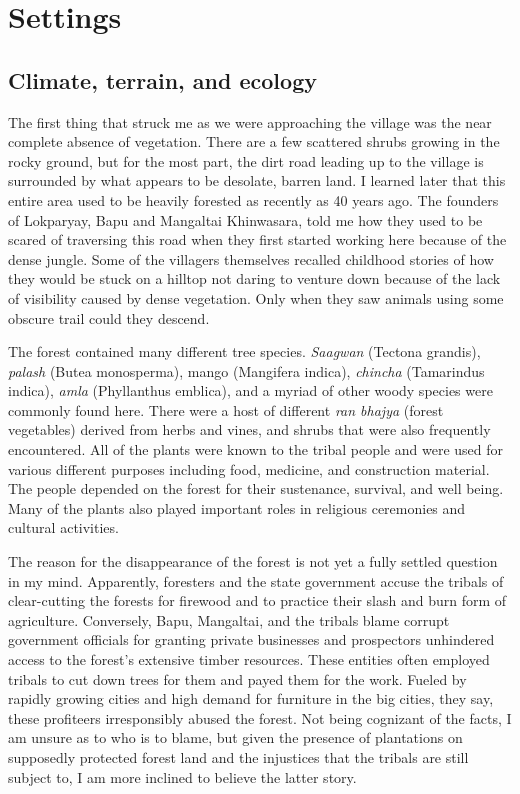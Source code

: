\documentclass{report}
\begin{document}
\tableofcontents

\chapter{Settings}
\section{Climate, terrain, and ecology}

The first thing that struck me as we were approaching the village was the near complete absence of vegetation. There are a few scattered shrubs growing in the rocky ground, but for the most part, the dirt road leading up to the village is surrounded by what appears to be desolate, barren land. I learned later that this entire area used to be heavily forested as recently as 40 years ago. The founders of Lokparyay, Bapu and Mangaltai Khinwasara, told me how they used to be scared of traversing this road when they first started working here because of the dense jungle. Some of the villagers themselves recalled childhood stories of how they would be stuck on a hilltop not daring to venture down because of the lack of visibility caused by dense vegetation. Only when they saw animals using some obscure trail could they descend.

The forest contained many different tree species. \textit{Saagwan} (Tectona grandis), \textit{palash} (Butea monosperma), mango (Mangifera indica), \textit{chincha} (Tamarindus indica), \textit{amla} (Phyllanthus emblica), and a myriad of other woody species were commonly found here. There were a host of different \textit{ran bhajya} (forest vegetables) derived from herbs and vines, and shrubs that were also frequently encountered. All of the plants were known to the tribal people and were used for various different purposes including food, medicine, and construction material. The people depended on the forest for their sustenance, survival, and well being. Many of the plants also played important roles in religious ceremonies and cultural activities.

The reason for the disappearance of the forest is not yet a fully settled question in my mind. Apparently, foresters and the state government accuse the tribals of clear-cutting the forests for firewood and to practice their slash and burn form of agriculture. Conversely, Bapu, Mangaltai, and the tribals blame corrupt government officials for granting private businesses and prospectors unhindered access to the forest's extensive timber resources. These entities often employed tribals to cut down trees for them and payed them for the work. Fueled by rapidly growing cities and high demand for furniture in the big cities, they say, these profiteers irresponsibly abused the forest. Not being cognizant of the facts, I am unsure as to who is to blame, but given the presence of plantations on supposedly protected forest land and the injustices that the tribals are still subject to, I am more inclined to believe the latter story.
\end{document}

